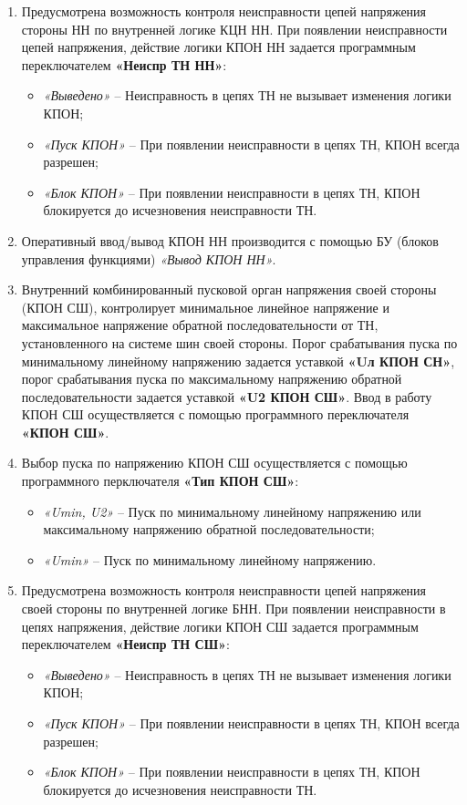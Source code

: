 \begin{enumerate}[label=\arabic{section}.\arabic{subsection}.\arabic*,  align=left, labelsep=4pt, leftmargin=0pt, itemindent=57pt]
\item
Предусмотрена возможность контроля неисправности цепей напряжения стороны НН по внутренней
логике КЦН НН. При появлении неисправности цепей напряжения, действие логики КПОН НН задается
программным переключателем \textbf{«Неиспр ТН НН»}:
\begin{itemize}
\item \textit{«Выведено»} -- Неисправность в цепях ТН не вызывает изменения логики КПОН;
\item \textit{«Пуск КПОН»} -- При появлении неисправности в цепях ТН, КПОН всегда разрешен;
\item \textit{«Блок КПОН»} -- При появлении неисправности в цепях ТН, КПОН блокируется до исчезновения неисправности ТН.
\end{itemize}

\item
Оперативный ввод/вывод КПОН НН производится с помощью БУ (блоков управления функциями) \textit{«Вывод КПОН НН»}. 

\item
Внутренний комбинированный пусковой орган напряжения своей стороны (КПОН СШ), контролирует
минимальное линейное напряжение и максимальное напряжение обратной последовательности от ТН,
установленного на системе шин своей стороны. Порог срабатывания пуска по минимальному линейному
напряжению задается уставкой \textbf{«Uл КПОН СН»}, порог срабатывания пуска по максимальному напряжению
обратной последовательности задается уставкой \textbf{«U2 КПОН СШ»}. Ввод в работу КПОН СШ осуществляется с
помощью программного переключателя \textbf{«КПОН СШ»}.

\item
Выбор пуска по напряжению КПОН СШ осуществляется с помощью программного перключателя \textbf{«Тип КПОН СШ»}:
\begin{itemize}
\item \textit{«Umin, U2»} -- Пуск по минимальному линейному напряжению или максимальному напряжению обратной последовательности;
\item \textit{«Umin»} -- Пуск по минимальному линейному напряжению.
\end{itemize}

\item
Предусмотрена возможность контроля неисправности цепей напряжения своей стороны по внутренней
логике БНН. При появлении неисправности в цепях напряжения, действие логики КПОН СШ задается
программным переключателем \textbf{«Неиспр ТН СШ»}:
\begin{itemize}
\item \textit{«Выведено»} -- Неисправность в цепях ТН не вызывает изменения логики КПОН;
\item \textit{«Пуск КПОН»} -- При появлении неисправности в цепях ТН, КПОН всегда разрешен;
\item \textit{«Блок КПОН»} -- При появлении неисправности в цепях ТН, КПОН блокируется до исчезновения неисправности ТН.
\end{itemize}


\end{enumerate}

